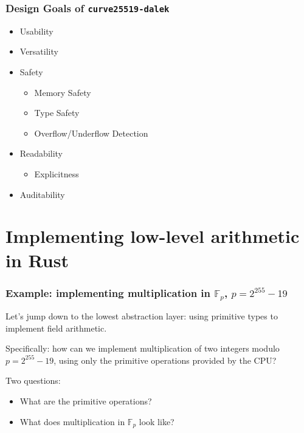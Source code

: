 \documentclass[xetex,aspectratio=169]{beamer}
\newcommand{\FF}{\mathbb{F}}
\begin{document}
  \begin{frame}
    \frametitle{Design Goals of \texttt{curve25519-dalek}}

    \begin{itemize}
      \item<1-> Usability
      \item<2-> Versatility %
      \item<3-> Safety
        {\small
        \begin{itemize}
          \item<4-> Memory Safety
          \item<5-> Type Safety
          \item<6-> Overflow/Underflow Detection
        \end{itemize}
        }
      \item<7-> Readability 
        {\small
        \begin{itemize}
          \item<8-> Explicitness
        \end{itemize}
        }
      \item<10-> Auditability
    \end{itemize}


     

  \end{frame}


\section{Implementing low-level arithmetic in Rust}

  \begin{frame}
    \frametitle{Example: implementing multiplication in $\FF_p$, $p = 2^{255} - 19$}
    
    Let's jump down to the lowest abstraction layer: using primitive
types to implement field arithmetic.
    
    \pause Specifically: how can we implement multiplication of two
integers modulo $p = 2^{255} - 19$, using only the primitive
operations provided by the CPU?

    \pause Two questions:
    \begin{itemize}
    \item<4-> What are the primitive operations?
    \item<5-> What does multiplication in $\FF_p$ look like?
    \end{itemize}
  \end{frame}
  
\end{document}
